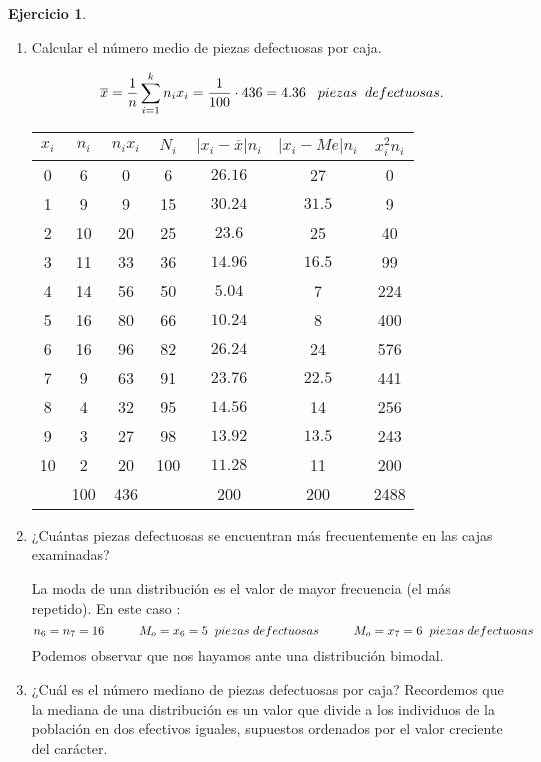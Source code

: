 \documentclass[a4paper, 12pt]{article}
\providecommand{\abs}[1]{\lvert#1\rvert}
\theoremstyle{definition}
\newtheorem{ej}{Ejercicio}
\begin{document}
\begin{ej}
\begin{enumerate}[label=\textit{\alph*)}]
    \item Calcular el número medio de piezas defectuosas por caja.
    
    \[
    \overline{x} = \frac{1}{n} \sum_{i=1}^{k}n_ix_i = \frac{1}{100} \cdot 436 = 4.36 \hspace{0.3cm} piezas \hspace{0.2cm} defectuosas.
    \]
    
    \begin{center}
    \begin{tabular}{|c|c|c|c|c|c|c|}
    \hline
    \(x_i\) & \(n_i\) & \(n_i x_i\) & \(N_i\) & \(\abs{x_i -\overline{x}} n_i\) & \(\abs{x_i - Me} n_i\) & \(x_i^2 n_i\) \\
    \hline
    0 & 6 & 0 & 6 & \(26.16\) & 27 & 0 \\ 
    1 & 9 & 9 & 15 & \(30.24\) & \(31.5\) & 9 \\
    2 & 10 & 20 & 25 & \(23.6\) & 25 & 40 \\
    3 & 11 & 33 & 36 & \(14.96\) & \(16.5\) & 99 \\
    4 & 14 & 56 & 50 & \(5.04\) & 7 & 224 \\
    5 & 16 & 80 & 66 & \(10.24\) & 8 & 400 \\
    6 & 16 & 96 & 82 & \(26.24\) & 24 & 576 \\ 
    7 & 9 & 63 & 91 & \(23.76\) & \(22.5\) & 441 \\
    8 & 4 & 32 & 95 & \(14.56\) & 14 & 256 \\
    9 & 3 & 27 & 98 & \(13.92\) & \(13.5\) & 243 \\
    10 & 2 & 20 & 100 & \(11.28\) & 11 & 200 \\
    \hline
    & 100 & 436 & & 200 & 200 & 2488 \\
    \hline
    \end{tabular}
        
    \end{center}
    
    \item ¿Cuántas piezas defectuosas se encuentran más frecuentemente en las cajas examinadas?
    
    La moda de una distribución es el valor de mayor frecuencia (el más repetido). En este caso :
    \[
    n_6 = n_7 = 16 \hspace{1cm} M_o = x_6 = 5 \hspace{0.2cm} piezas \hspace{0.1cm} defectuosas \hspace{1cm} M_o = x_7 = 6 \hspace{0.2cm} piezas \hspace{0.1cm} defectuosas
    \]
    Podemos observar que nos hayamos ante una distribución bimodal.
    \item ¿Cuál es el número mediano de piezas defectuosas por caja?
    Recordemos que la mediana de una distribución es un valor que divide a los individuos de la población en dos efectivos iguales, supuestos ordenados por el valor creciente del carácter.
    

\end{enumerate}
\end{ej}
\end{document}
